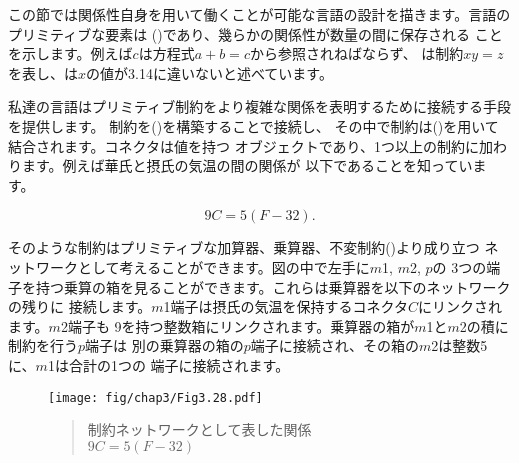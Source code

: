 この節では関係性自身を用いて働くことが可能な言語の設計を描きます。言語のプリミティブな要素は
()であり、幾らかの関係性が数量の間に保存される
ことを示します。例えば\( c \)は方程式\( a + b = c \)から参照されねばならず、
は制約\( xy = z \)を表し、は\( x \)の値が3.14に違いないと述べています。



私達の言語はプリミティブ制約をより複雑な関係を表明するために接続する手段を提供します。
制約を()を構築することで接続し、
その中で制約は()を用いて結合されます。コネクタは値を持つ
オブジェクトであり、1つ以上の制約に加わります。例えば華氏と摂氏の気温の間の関係が
以下であることを知っています。
\begin{comment}

\begin{example}
9C = 5(F - 32)
\end{example}

\end{comment}
\begin{displaymath}
 9C = 5(F - 32). 
\end{displaymath}

そのような制約はプリミティブな加算器、乗算器、不変制約()より成り立つ
ネットワークとして考えることができます。図の中で左手に\( m \)1, \( m \)2, \( p \)の
3つの端子を持つ乗算の箱を見ることができます。これらは乗算器を以下のネットワークの残りに
接続します。\( m \)1端子は摂氏の気温を保持するコネクタ\( C \)にリンクされます。\( m \)2端子も
9を持つ整数箱にリンクされます。乗算器の箱が\( m \)1と\( m \)2の積に制約を行う\( p \)端子は
別の乗算器の箱の\( p \)端子に接続され、その箱の\( m \)2は整数5に、\( m \)1は合計の1つの
端子に接続されます。

\begin{figure}[tb]
\label{Figure 3.28}
\centering
\begin{comment}
\begin{quote}
\heading{Figure 3.28:} The relation \( 9C = 5(F - 32) \) expressed as a constraint network.

\begin{example}
       +---------+     +---------+   v   +---------+
C -----+ m1      |  u  |      m1 +-------+ a1      |
       |    *  p +-----+ p  *    |       |    *  s +---- F
    +--+ m2      |     |      m2 +--+ +--+ a2      |
    |  +---------+     +---------+  | |  +---------+
  w |                              x| |y
    |    +-----+        +-----+     | |     +-----+
    +----+  9  |        |  5  +-----+ +-----+  32 |
         +-----+        +-----+             +-----+
\end{example}
\end{quote}
\end{comment}
\texttt{[image: fig/chap3/Fig3.28.pdf]}
\begin{quote}
 制約ネットワークとして表した関係\\
\( 9C = 5(F - 32) \)
\end{quote}
\end{figure}

